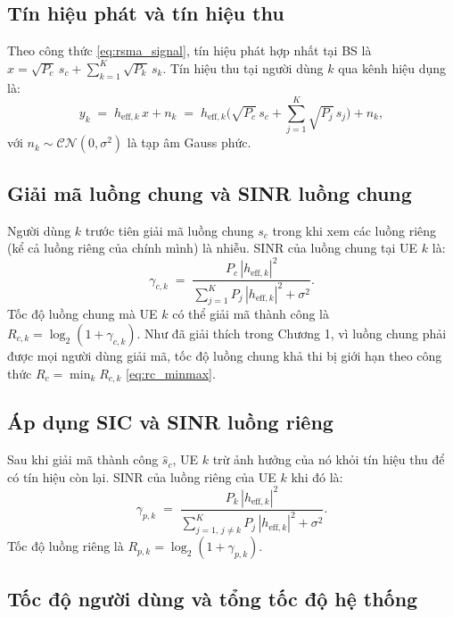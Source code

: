\subsection{Tín hiệu phát và tín hiệu thu}

Theo công thức \eqref{eq:rsma_signal}, tín hiệu phát hợp nhất tại BS là
$x = \sqrt{P_c}\,s_c + \sum_{k=1}^{K}\sqrt{P_k}\,s_k$. Tín hiệu thu tại
người dùng $k$ qua kênh hiệu dụng là:
\begin{equation}
  y_k \;=\; h_{\text{eff},k}\,x + n_k
        \;=\; h_{\text{eff},k}\Big(\sqrt{P_c}\,s_c + \sum_{j=1}^{K}\sqrt{P_j}\,s_j\Big)
        + n_k,
  \label{eq:yk}
\end{equation}
với $n_k \sim \mathcal{CN}(0, \sigma^2)$ là tạp âm Gauss phức.

\subsection{Giải mã luồng chung và SINR luồng chung}

Người dùng $k$ trước tiên giải mã luồng chung $s_c$ trong khi xem các
luồng riêng (kể cả luồng riêng của chính mình) là nhiễu. SINR của luồng
chung tại UE $k$ là:
\begin{equation}
  \gamma_{c,k} \;=\; \frac{P_c\,|h_{\text{eff},k}|^2}
                          {\sum_{j=1}^{K} P_j\,|h_{\text{eff},k}|^2 + \sigma^2}.
  \label{eq:sinr_c}
\end{equation}
Tốc độ luồng chung mà UE $k$ có thể giải mã thành công là
$R_{c,k} = \log_2(1+\gamma_{c,k})$. Như đã giải thích trong Chương 1, vì
luồng chung phải được mọi người dùng giải mã, tốc độ luồng chung
khả thi bị giới hạn theo công thức $R_c = \min_k R_{c,k}$
\eqref{eq:rc_minmax}.

\subsection{Áp dụng SIC và SINR luồng riêng}

Sau khi giải mã thành công $\hat s_c$, UE $k$ trừ ảnh hưởng của nó khỏi
tín hiệu thu để có tín hiệu còn lại. SINR của luồng riêng của UE $k$
khi đó là:
\begin{equation}
  \gamma_{p,k} \;=\; \frac{P_k\,|h_{\text{eff},k}|^2}
                          {\sum_{j=1,\,j\neq k}^{K} P_j\,|h_{\text{eff},k}|^2 + \sigma^2}.
  \label{eq:sinr_p}
\end{equation}
Tốc độ luồng riêng là $R_{p,k} = \log_2(1+\gamma_{p,k})$.

\subsection{Tốc độ người dùng và tổng tốc độ hệ thống}

